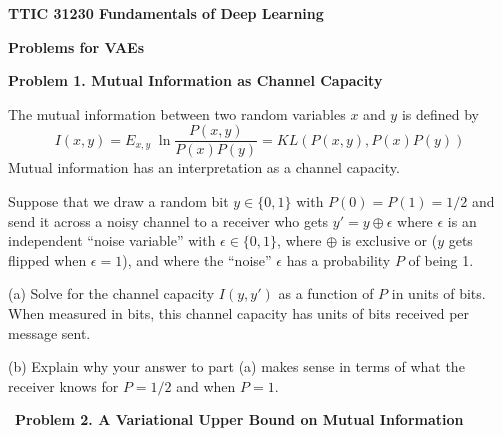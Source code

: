 \documentclass{article}
\newcommand{\solution}[1]{}
\begin{document}
\centerline{\bf TTIC 31230 Fundamentals of Deep Learning}

\bigskip

\centerline{\bf Problems for VAEs}

\bigskip
\bigskip

{\bf Problem 1.  Mutual Information as Channel Capacity}

The mutual information between two random variables $x$ and $y$ is defined by
$$I(x,y) = E_{x,y}\;\ln\frac{P(x,y)}{P(x)P(y)} = KL(P(x,y),P(x)P(y))$$
Mutual information has an interpretation as a channel capacity.

\medskip
Suppose that
we draw a random bit $y \in \{0,1\}$ with $P(0) = P(1) = 1/2$ and send it across a noisy channel
to a receiver who gets $y' = y \oplus \epsilon$ where $\epsilon$ is an independent ``noise variable'' with $\epsilon \in\{0,1\}$, where
$\oplus$ is exclusive or ($y$ gets flipped when $\epsilon = 1$),
and where the ``noise'' $\epsilon$ has a probability $P$ of being 1.

\medskip(a) Solve for the channel capacity $I(y,y')$ as a function of $P$ in units of bits.
When measured in bits, this channel capacity has units of bits received per message sent.

\solution{
  \begin{eqnarray*}
    I(y,y') & = & H(y) - H(y|y') \\
    H(y) & = & 1\;\mathrm{bit} \\
    \\
    H(y|y') & = & P(y=y') (- \log_2 P(y=y')) + P(y \not = y') (-log_2 P(y \not = y')) \\
    & = & P(\epsilon = 0) (-\log_2 P(\epsilon = 0)) + P(\epsilon = 1) -log_2 P(\epsilon = 1) \\
    & = & (1-P) \log_2 1/(1-P) + P \log_2 1/P \\
    & = & H(P)
  \end{eqnarray*}
}

\medskip
(b) Explain why your answer to part (a) makes sense in terms of what the receiver knows for $P = 1/2$ and when $P=1$.

\solution{
  For $P = 1/2$ we have $H(P) = 1$ bit and $I(y,y') = H(y) - H(P) = 0$ and the receiver knows nothing about $y$.
  For $P = 1$ we have $H(P) = 0$  and $I(y',y) = 1$ bit.  Note that in this case $y'$ is $1-y$ so $y'$ carries full information about $y$.
}

\bigskip
~{\bf Problem 2. A Variational Upper Bound on Mutual Information}
\end{document}
